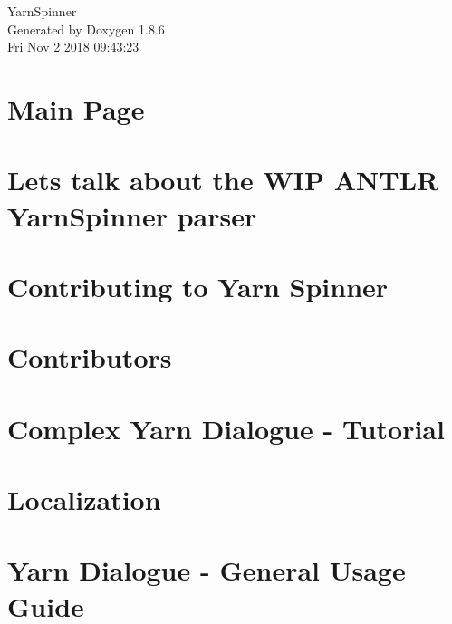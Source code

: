 \documentclass[twoside]{book}
\newcommand{\clearemptydoublepage}{%
  \newpage{\pagestyle{empty}\cleardoublepage}%
}
\begin{document}
\hypersetup{pageanchor=false}
\begin{titlepage}
\vspace*{7cm}
\begin{center}%
{\Large Yarn\-Spinner }\\
\vspace*{1cm}
{\large Generated by Doxygen 1.8.6}\\
\vspace*{0.5cm}
{\small Fri Nov 2 2018 09:43:23}\\
\end{center}
\end{titlepage}
\clearemptydoublepage
\tableofcontents
\clearemptydoublepage
{}
\hypersetup{pageanchor=true}

\chapter{Main Page}
\label{index}\hypertarget{index}{}
\chapter{Lets talk about the W\-I\-P A\-N\-T\-L\-R Yarn\-Spinner parser}
\label{a00002}
\hypertarget{a00002}{}

\chapter{Contributing to Yarn Spinner}
\label{a00004}
\hypertarget{a00004}{}

\chapter{Contributors}
\label{a00006}
\hypertarget{a00006}{}

\chapter{Complex Yarn Dialogue -\/ Tutorial}
\label{a00008}
\hypertarget{a00008}{}

\chapter{Localization}
\label{a00010}
\hypertarget{a00010}{}

\chapter{Yarn Dialogue -\/ General Usage Guide}
\label{a00012}
\hypertarget{a00012}{}

\end{document}
